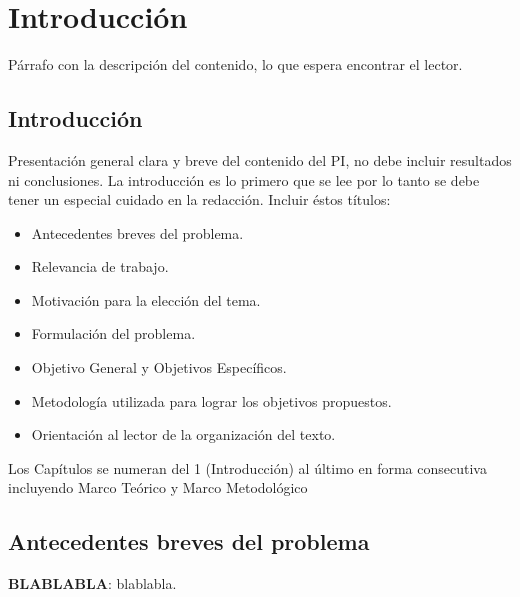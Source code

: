 \chapter{Introducción}

Párrafo con la descripción del contenido, lo que espera encontrar el lector.

\section*{Introducción}

Presentación general clara y breve del contenido del PI, no debe incluir resultados ni conclusiones. 
La introducción es lo primero que se lee por lo tanto se debe tener un especial cuidado en la redacción. 
Incluir éstos títulos:

\begin{itemize}
    \item Antecedentes breves del problema.
    \item Relevancia de trabajo.
    \item Motivación para la elección del tema. 
    \item Formulación del problema.
    \item Objetivo General y Objetivos Específicos.
    \item Metodología utilizada para lograr los objetivos propuestos.
    \item Orientación al lector de la organización del texto.
\end{itemize}

Los Capítulos se numeran del 1 (Introducción) al último en forma consecutiva incluyendo Marco Teórico y Marco Metodológico


\section{Antecedentes breves del problema}

    \textbf{BLABLABLA}: blablabla. \cite{von_hagen_definitive_2006}


